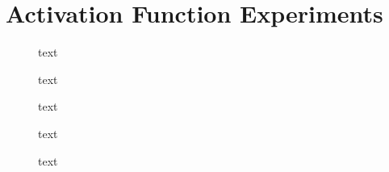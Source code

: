 \section{Activation Function Experiments}

\begin{figure}[h]
	\centering
	
	\caption{text}
\end{figure}

\begin{figure}[h]
	\centering
	
	
	\caption{text}
	
	\vspace*{2cm}
	
	
	\caption{text}
\end{figure}

\begin{figure}[h]
	\centering

	
	\caption{text}
	
	\vspace*{2cm}
	
	
	\caption{text}
\end{figure}